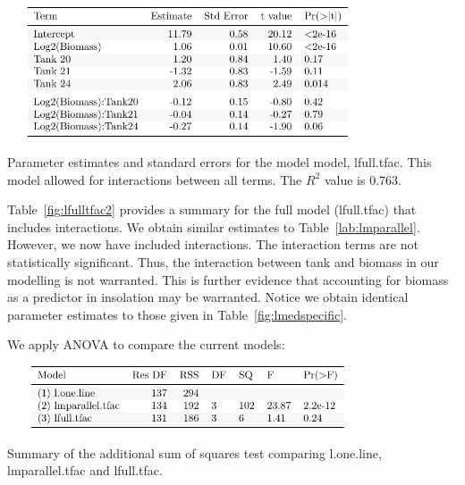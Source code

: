    \vspace{12pt}



\begin{table}[H]
\includegraphics{Chapter3Images/lfulltfac.pdf}
\caption{\hspace{1mm}Parameter estimates and standard errors for the model model, lfull.tfac. This model allowed for interactions between all terms. The $R^{2}$ value is 0.763.}
\label{fig:lfulltfac2}
\end{table}

Table~\ref{fig:lfulltfac2} provides a summary for the full model (lfull.tfac) that includes interactions. We obtain similar estimates to Table~\ref{lab:lmparallel}. However, we now have included interactions. The interaction terms are not statistically significant.  Thus, the interaction between tank and biomass in our modelling is not warranted. This is further evidence that accounting for biomass as a predictor in insolation may be warranted. Notice we obtain identical parameter estimates to those given in Table~\ref{fig:lmedspecific}.

\newpage

We apply ANOVA to compare the current models:

   \vspace{12pt}
 


\begin{table}[H]
\includegraphics{Chapter3Images/anova1.pdf}
\caption{\hspace{1mm}Summary of the additional sum of squares test comparing l.one.line,  lmparallel.tfac and lfull.tfac.}
\label{fig:anovacompare2}
\end{table}


